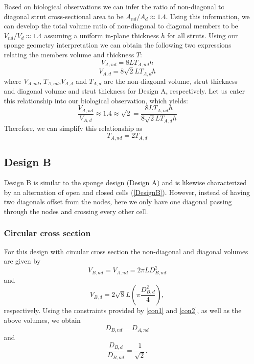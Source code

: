 \documentclass[10pt,twoside]{fernandes_supp}
\begin{document}
Based on biological observations we can infer the ratio of non-diagonal to diagonal strut cross-sectional area to be  $A_{nd}/A_d\approx 1.4$. Using this information, we can develop the total volume ratio of non-diagonal to diagonal members to be $V_{nd}/V_d\approx 1.4$ assuming a uniform in-plane thickness $h$ for all struts. Using our sponge geometry interpretation we can obtain the following two expressions relating the members volume and thickness $T$:
\begin{equation}
	V_{A,nd}=8LT_{A,nd}h
\end{equation}
\begin{equation}
	V_{A,d}=8\sqrt{2}LT_{A,d}h
\end{equation}
where $V_{A,nd}$, $T_{A,nd}$,$V_{A,d}$ and $T_{A,d}$ are the non-diagonal volume, strut thickness and diagonal volume and strut thickness for Design A, respectively. Let us enter this relationship into our biological observation, which yields:
\begin{equation}
	\frac{V_{A,nd}}{V_{A,d}}\approx 1.4\approx\sqrt{2}=\frac{8LT_{A,nd}h}{8\sqrt{2}LT_{A,d}h}
\end{equation}
Therefore, we can simplify this relationship as
\begin{equation}
	T_{A,nd}=2T_{A,d}
\end{equation}

\subsection{Design B}
Design B is similar to the sponge design (Design A) and is likewise characterized by an alternation of open and closed cells (\cref{DesignB}). However, instead of having two diagonals offset from the nodes, here we only have one diagonal passing through the nodes and crossing every other cell. 

\subsubsection{Circular cross section}
For this design with circular cross section the non-diagonal and diagonal volumes are given by
\begin{equation}
V_{B,nd}=V_{A,nd}=2\pi L D_{B,nd}^2
\end{equation}
and
\begin{equation}
V_{B,d}=2\sqrt{8} L \left(\pi \frac{{D}_{B,d}^2}{4}\right),
\end{equation}
respectively.
Using the constraints provided by \cref{con1} and \cref{con2}, as well as the above volumes, we  obtain 
\begin{equation}
{{D}_{B,nd}}={{D}_{A,nd}}
\end{equation}
and
\begin{equation}
\frac{{D}_{B,d}}{{D}_{B,nd}}=\frac{1}{\sqrt{2}}.
\end{equation}
\end{document}
